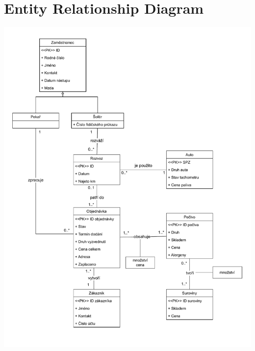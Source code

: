 \documentclass[a4paper, 12pt]{article}
\begin{document}
\section{Entity Relationship Diagram}
\begin{center}
    \includegraphics[scale=0.75]{img/erd.pdf}
\end{center}

\end{document}

